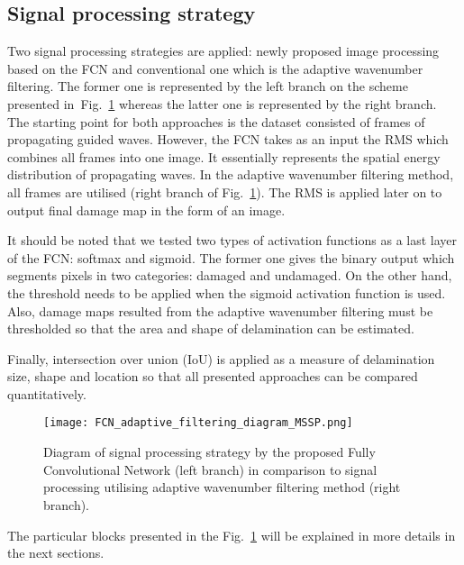 \subsection{Signal processing strategy}
Two signal processing strategies are applied: newly proposed image processing based on the FCN and conventional one which is the adaptive wavenumber filtering.
The former one is represented by the left branch on the scheme presented in~Fig.~\ref{fig:sig_proc_strategy} whereas the latter one is represented by the right branch.
The starting point for both approaches is the dataset consisted of frames of propagating guided waves.
However, the FCN takes as an input the RMS which combines all frames into one image. 
It essentially represents the spatial energy distribution of propagating waves.
In the adaptive wavenumber filtering method, all frames are utilised (right branch of Fig.~\ref{fig:sig_proc_strategy}).
The RMS is applied later on to output final damage map in the form of an image.

It should be noted that we tested two types of activation functions as a last layer of the FCN: softmax and sigmoid.
The former one gives the binary output which segments pixels in two categories: damaged and undamaged.
On the other hand, the threshold needs to be applied when the sigmoid activation function is used.
Also, damage maps resulted from the adaptive wavenumber filtering must be thresholded so that the area and shape of delamination can be estimated.

Finally, intersection over union (IoU) is applied as a measure of delamination size, shape and location so that all presented approaches can be compared quantitatively. 

	\begin{figure}
		\centering
		\texttt{[image: FCN\_adaptive\_filtering\_diagram\_MSSP.png]}
		\caption{Diagram of signal processing strategy by the proposed Fully Convolutional Network (left branch) in comparison to signal processing utilising adaptive wavenumber filtering method (right branch). }
		\label{fig:sig_proc_strategy}
	\end{figure}

The particular blocks presented in the Fig.~\ref{fig:sig_proc_strategy} will be explained in more details in the next sections.